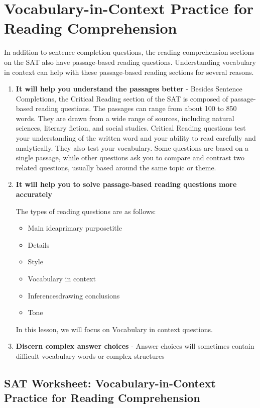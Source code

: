 \section{\sloppy Vocabulary-in-Context Practice for Reading Comprehension}
In addition to sentence completion questions, the reading comprehension sections on the SAT also have passage-based reading questions. Understanding vocabulary in context can help with these passage-based reading sections for several reasons. 

\begin{enumerate}
\item \textbf{\large It will help you understand the passages better} - Besides Sentence Completions, the Critical Reading section of the SAT is composed of passage-based reading questions.  The passages can range from about 100 to 850 words.  They are drawn from a wide range of sources, including natural sciences, literary fiction, and social studies.  Critical Reading questions test your understanding of the written word and your ability to read carefully and analytically.  They also test your vocabulary.  Some questions are based on a single passage, while other questions ask you to compare and contrast two related questions, usually based around the same topic or theme.

\item \textbf{\large It will help you to solve passage-based reading questions more accurately}

The types of reading questions are as follows:

\begin{itemize}
\item Main idea\/primary purpose\/title
\item Details
\item Style
\item Vocabulary in context
\item Inferences\/drawing conclusions
\item Tone
\end{itemize}
 
In this lesson, we will focus on Vocabulary in context questions. 

\item \textbf{\large Discern complex answer choices} - Answer choices will sometimes contain difficult vocabulary words or complex structures 

\end{enumerate} 

\newpage
\subsection{SAT Worksheet: Vocabulary-in-Context Practice for Reading Comprehension}


